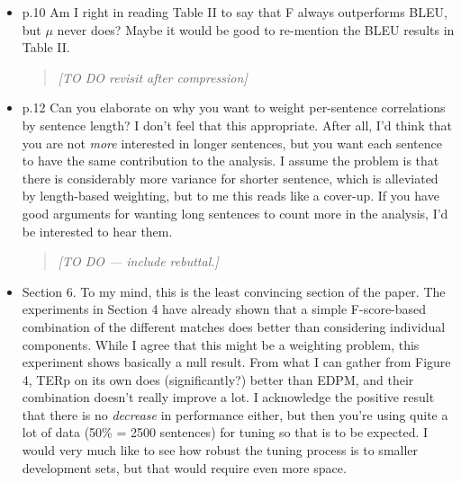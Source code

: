 \documentclass[letterpaper,12pt]{article}
\newenvironment{response}
{\begin{quotation} \it}
  {\end{quotation}}
\begin{document}
\begin{itemize}
\begin{response}
    Section 4 is intended to match the Owczarzak \textit{et al.} data
    selection, but sections 5 and 6 do not; in sections 5 and 6 the
    data available \emph{does} allow multiple translations of the same
    segment and thus we can use mean-subtraction. Mean subtraction is
    only used in sections 5 and 6, and the discussion of
    mean-subtraction has been moved to the beginning of section 5 for
    clarity.
  \end{response}

\item  p.10 Am I right in reading Table II to say that F always
  outperforms BLEU, but $\mu$ never does? Maybe it would be good to
  re-mention the BLEU results in Table II.
  \begin{response}
    [TO DO revisit after compression]
  \end{response}

\item  p.12 Can you elaborate on why you want to weight per-sentence
  correlations by sentence length? I don't feel that this
  appropriate. After all, I'd think that you are not \emph{more}
  interested in longer sentences, but you want each sentence to have
  the same contribution to the analysis. I assume the problem is that
  there is considerably more variance for shorter sentence, which is
  alleviated by length-based weighting, but to me this reads like a
  cover-up. If you have good arguments for wanting long sentences to
  count more in the analysis, I'd be interested to hear them.
  \begin{response}
    [TO DO --- include rebuttal.]
  \end{response}

\item  Section 6. To my mind, this is the least convincing section of the
  paper. The experiments in Section 4 have already shown that a simple
  F-score-based combination of the different matches does better than
  considering individual components. While I agree that this might be
  a weighting problem, this experiment shows basically a null result.
  From what I can gather from Figure 4, TERp on its own does
  (significantly?) better than EDPM, and their combination doesn't
  really improve a lot. I acknowledge the positive result that there
  is no \emph{decrease} in performance either, but then you're using
  quite a lot of data (50\% = 2500 sentences) for tuning so that is to
  be expected. I would very much like to see how robust the tuning
  process is to smaller development sets, but that would require even
  more space.
\end{itemize}
\end{document}
